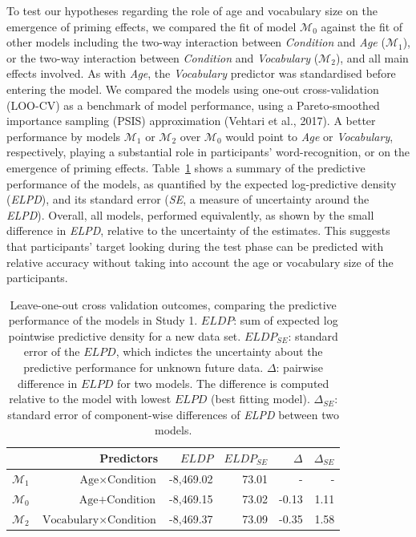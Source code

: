 \documentclass[
  12pt,
  b5paperpaper,
  twoside]{scrreprt}
\begin{document}
To test our hypotheses regarding the role of age and vocabulary size on
the emergence of priming effects, we compared the fit of model
\(\mathcal{M}_0\) against the fit of other models including the two-way
interaction between \emph{Condition} and \emph{Age} (\(\mathcal{M}_1\)),
or the two-way interaction between \emph{Condition} and
\emph{Vocabulary} (\(\mathcal{M}_2\)), and all main effects involved. As
with \emph{Age}, the \emph{Vocabulary} predictor was standardised before
entering the model. We compared the models using one-out
cross-validation (LOO-CV) as a benchmark of model performance, using a
Pareto-smoothed importance sampling (PSIS) approximation (Vehtari et
al., 2017). A better performance by models \(\mathcal{M}_1\) or
\(\mathcal{M}_2\) over \(\mathcal{M}_0\) would point to \emph{Age} or
\emph{Vocabulary}, respectively, playing a substantial role in
participants' word-recognition, or on the emergence of priming effects.
Table~\ref{tbl-loos-oxf} shows a summary of the predictive performance
of the models, as quantified by the expected log-predictive density
(\emph{ELPD}), and its standard error (\emph{SE}, a measure of
uncertainty around the \emph{ELPD}). Overall, all models, performed
equivalently, as shown by the small difference in \emph{ELPD}, relative
to the uncertainty of the estimates. This suggests that participants'
target looking during the test phase can be predicted with relative
accuracy without taking into account the age or vocabulary size of the
participants.

\hypertarget{tbl-loos-oxf}{}
\begin{table}
\caption{\label{tbl-loos-oxf}Leave-one-out cross validation outcomes, comparing the predictive
performance of the models in Study 1. \(ELDP\): sum of expected log
pointwise predictive density for a new data set. \(ELDP_{SE}\): standard
error of the \(ELPD\), which indictes the uncertainty about the
predictive performance for unknown future data. \(\Delta\): pairwise
difference in \(ELPD\) for two models. The difference is computed
relative to the model with lowest \(ELPD\) (best fitting model).
\(\Delta_{SE}\): standard error of component-wise differences of
\emph{ELPD} between two models. }\tabularnewline

\centering
\begin{tabular}{lrrrrr}
\toprule
  & Predictors & $ELDP$ & $ELDP_{SE}$ & $\Delta$ & $\Delta_{SE}$\\
\midrule
$\mathcal{M}_1$ & $\text{Age} \times \text{Condition}$ & -8,469.02 & 73.01 & - & -\\
$\mathcal{M}_0$ & $\text{Age} + \text{Condition}$ & -8,469.15 & 73.02 & -0.13 & 1.11\\
$\mathcal{M}_2$ & $\text{Vocabulary} \times \text{Condition}$ & -8,469.37 & 73.09 & -0.35 & 1.58\\
\bottomrule
\end{tabular}
\end{table}
\end{document}
